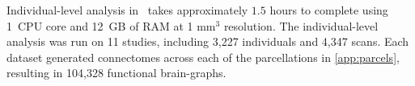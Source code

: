 \documentclass[11pt]{article}
\begin{document}
\begin{multicols}{2}
%
%
%
%


Individual-level analysis in \ndmgd~takes approximately $1.5$ hours to complete using 1~CPU core and 12~GB of RAM at 1 mm$^3$ resolution.
The individual-level analysis was run on 11 studies, including 3,227 individuals and 4,347 scans. Each dataset generated connectomes across each of the parcellations in \ref{app:parcels}, resulting in 104,328 functional brain-graphs.



\end{multicols}
\end{document}
